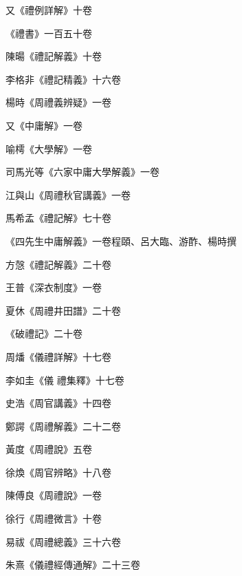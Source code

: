 \begin{pinyinscope}
 又《禮例詳解》十卷



 《禮書》一百五十卷



 陳暘《禮記解義》十卷



 李格非《禮記精義》十六卷



 楊時《周禮義辨疑》一卷



 又《中庸解》一卷



 喻樗《大學解》一卷



 司馬光等《六家中庸大學解義》一卷



 江與山《周禮秋官講義》一卷



 馬希孟《禮記解》七十卷



 《四先生中庸解義》一卷程頤、呂大臨、游酢、楊時撰



 方愨《禮記解義》二十卷



 王普《深衣制度》一卷



 夏休《周禮井田譜》二十卷



 《破禮記》二十卷



 周燔《儀禮詳解》十七卷



 李如圭《儀
 禮集釋》十七卷



 史浩《周官講義》十四卷



 鄭諤《周禮解義》二十二卷



 黃度《周禮說》五卷



 徐煥《周官辨略》十八卷



 陳傅良《周禮說》一卷



 徐行《周禮微言》十卷



 易祓《周禮總義》三十六卷



 朱熹《儀禮經傳通解》二十三卷




\end{pinyinscope}

